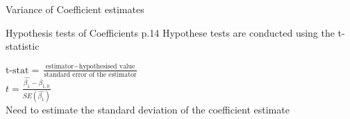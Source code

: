 \documentclass[14pt,xcolor=pdftex,dvipsnames,table]{beamer}\usepackage[]{graphicx}\usepackage[]{color}
\begin{document}
\begin{frame}{Variance of Coefficient estimates}
\graphicspath{{./Figures/}}
\begin{center}
\end{center}
\end{frame}

\begin{frame}{Hypothesis tests of Coefficients p.14}
Hypothese tests are conducted using the t-statistic
\begin{block}{}
$\text{t-stat} = \frac{\text{estimator} - \text{hypothesised value}}{\text{standard error of the estimator}}$\\ 
\vskip 0.5cm
$t = \frac{\hat{\beta_1}-\beta_{1,0}}{SE(\hat{\beta_1})}$\\
\vskip 0.5cm 
Need to estimate the standard deviation of the coefficient estimate
\end{block}
\end{frame}

\end{document}
